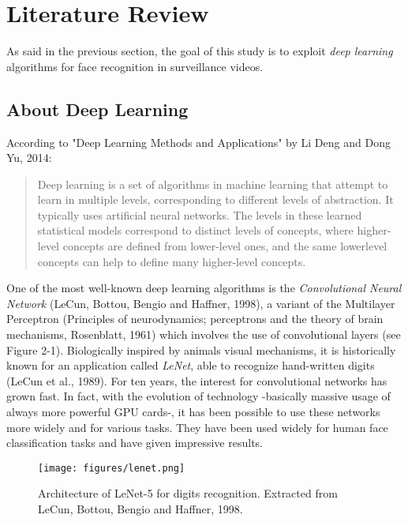 \setlength{\footskip}{8mm}

\chapter{Literature Review} 
\label{ch:literature-review}

As said in the previous section, the goal of this study is to exploit \textit{deep learning} algorithms for face recognition in surveillance videos.\\

\section{About Deep Learning}
\label{Main-keywords-of-the-topic}
According to "Deep Learning Methods and Applications" by Li Deng and Dong Yu, 2014:

\blockquote{Deep learning is a set of algorithms in machine
learning that attempt to learn in multiple levels, corresponding
to different levels of abstraction. It typically uses artificial
neural networks. The levels in these learned statistical models
correspond to distinct levels of concepts, where higher-level concepts
are defined from lower-level ones, and the same lowerlevel
concepts can help to define many higher-level concepts.}

One of the most well-known deep learning algorithms is the \textit{Convolutional Neural Network} (LeCun, Bottou, Bengio and Haffner, 1998), a variant of the Multilayer Perceptron (Principles of neurodynamics; perceptrons and the theory of brain mechanisms, Rosenblatt, 1961) which involves the use of convolutional layers (see Figure 2-1). Biologically inspired by animals visual mechanisms, it is historically known for an application called \textit{LeNet}, able to recognize hand-written digits (LeCun et al., 1989). For ten years, the interest for convolutional networks has grown fast. In fact, with the evolution of technology -basically massive usage of always more powerful GPU cards-, it has been possible to use these networks more widely and for various tasks. They have been used widely for human face classification tasks and have given impressive results.

\begin{figure}[t]
  \centering
  \texttt{[image: figures/lenet.png]}  
  \caption[Architecture of LeNet-5 for digits recognition. Extracted from LeCun, Bottou, Bengio and Haffner, 1998.]{Architecture of LeNet-5 for digits recognition. Extracted from LeCun, Bottou, Bengio and Haffner, 1998.}
  \label{fig:lenet}
\end{figure}

